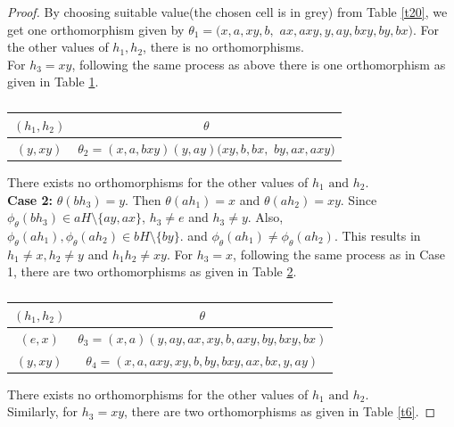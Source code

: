 \documentclass[11pt,a4paper]{article}
\theoremstyle{definition}
\theoremstyle{remark}
\begin{document}
\begin{proof}
	By choosing suitable value(the chosen cell is in grey) from Table \ref{t20}, we get one orthomorphism given by $\theta_{1} = (x,a,xy,b,$ $ax,axy,y,ay,bxy,by,bx)$.	For the other values of $h_{1},h_{2}$, there is no orthomorphisms.\\
	  For $h_{3} = xy$, following the same process as above there is one orthomorphism as given in Table \ref{t4}.
	\begin{table}[H]
	\begin{center}
			\begin{tabular}{|c|c|}
			\hline
			$(h_{1},h_{2})$ & $\theta$\\ \hline
			$(y,xy)$ &  $\theta_{2} = (x,a,bxy)(y,ay)(xy,b,bx,$ $by,ax,axy)$ \\ \hline
		\end{tabular}\caption{} \label{t4}
	\end{center}
	\end{table}
	\vspace{-.7cm}
	There exists no orthomorphisms for the other values of $h_{1} \text{ and } h_{2}$.\\
	\textbf{Case 2:}  $\theta(bh_{3}) = y.$ Then $\theta(ah_{1}) = x$ and $\theta(ah_{2}) = xy$. Since $\phi_{\theta}(bh_{3}) \in aH \setminus \{ay,ax\}$, $h_{3} \neq e$ and $h_{3} \neq y$. Also, $\phi_{\theta}(ah_{1}), \phi_{\theta}(ah_{2}) \in bH\setminus \{by\}.$ and $\phi_{\theta}(ah_{1}) \neq \phi_{\theta}(ah_{2})$. This results in $h_{1} \neq x, h_{2} \neq y$ and $h_{1}h_{2} \neq xy$. For $h_{3} = x$, following the same process as in Case 1, there are two orthomorphisms as given in Table \ref{t5}.
	\begin{table}[H]
	\begin{center}
			\begin{tabular}{|c|c|}
			\hline
			$(h_{1},h_{2})$ & $\theta$\\ \hline
			$(e,x)$ & $ \theta_{3}=(x,a)(y,ay,ax,xy,b,axy,by,bxy,bx)$ \\ \hline
			$(y,xy)$ & $\theta_{4}=(x,a,axy,xy,b,by,bxy,ax,bx,y,ay)$ \\ \hline
		\end{tabular}\caption{} \label{t5}
	\end{center}
	\end{table}
	\vspace{-.7cm}
	There exists no orthomorphisms for the other values of $h_{1} \text{ and } h_{2}$.\\
	Similarly, for $h_{3} = xy$, there are two orthomorphisms as given in Table \ref{t6}. 
	\begin{table}[H]

\end{table}
\end{proof}
\end{document}
